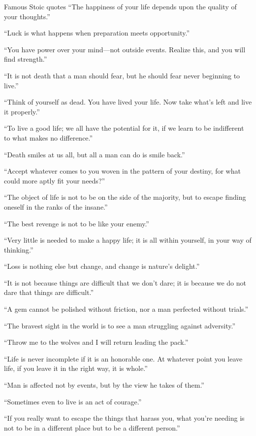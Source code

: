 Famous Stoic quotes
“The happiness of your life depends upon the quality of your thoughts.”

“Luck is what happens when preparation meets opportunity.”

“You have power over your mind—not outside events. Realize this, and you will find strength.”

“It is not death that a man should fear, but he should fear never beginning to live.”

“Think of yourself as dead. You have lived your life. Now take what’s left and live it properly.”

“To live a good life; we all have the potential for it, if we learn to be indifferent to what makes no difference.”

“Death smiles at us all, but all a man can do is smile back.”

“Accept whatever comes to you woven in the pattern of your destiny, for what could more aptly fit your needs?”

“The object of life is not to be on the side of the majority, but to escape finding oneself in the ranks of the insane.”

“The best revenge is not to be like your enemy.”

“Very little is needed to make a happy life; it is all within yourself, in your way of thinking.”

“Loss is nothing else but change, and change is nature’s delight.”

“It is not because things are difficult that we don’t dare; it is because we do not dare that things are difficult.”

“A gem cannot be polished without friction, nor a man perfected without trials.”

“The bravest sight in the world is to see a man struggling against adversity.”

“Throw me to the wolves and I will return leading the pack.”

“Life is never incomplete if it is an honorable one. At whatever point you leave life, if you leave it in the right way, it is whole.”

“Man is affected not by events, but by the view he takes of them.”

“Sometimes even to live is an act of courage.”

“If you really want to escape the things that harass you, what you’re needing is not to be in a different place but to be a different person.”

